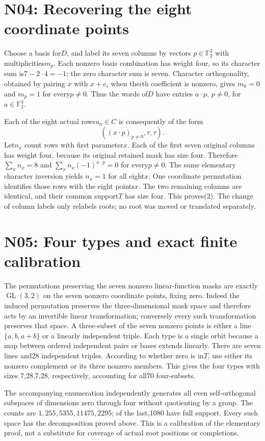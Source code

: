 \documentclass{article}
\begin{document}
\section{N04: Recovering the eight coordinate points}
Choose a basis for$D$, and label its seven columns by vectors
$p\in\mathbb F_2^3$ with multiplicities$m_p$. Each nonzero basis
combination has weight four, so its character sum is$7-2\cdot4=-1$;
the zero character sum is seven. Character orthogonality, obtained by
pairing $x$ with $x+e_i$ when the$i$th coefficient is nonzero, gives
$m_0=0$ and $m_p=1$ for every$p\ne0$. Thus the words of$D$ have
entries $a\cdot p$, $p\ne0$, for $a\in\mathbb F_2^3$.

Each of the eight actual rows$u_a\in C$ is consequently of the form
\[
              ((x\cdot p)_{p\ne0},\tau,\tau).
\]
Let$n_x$ count rows with first parameter$x$. Each of the first seven
original columns has weight four, because its original retained mask
has size four. Therefore $\sum_x n_x=8$ and
$\sum_x n_x(-1)^{x\cdot p}=0$ for every$p\ne0$. The same elementary
character inversion yields $n_x=1$ for all eight$x$. One coordinate
permutation identifies those rows with the eight points$x$.
The two remaining columns are identical, and their common support$T$
has size four. This proves(2). The change of column labels only
relabels roots; no root was moved or translated separately.

\section{N05: Four types and exact finite calibration}
The permutations preserving the seven nonzero linear-function masks
are exactly $\operatorname{GL}(3,2)$ on the seven nonzero coordinate
points, fixing zero. Indeed the induced permutation preserves the
three-dimensional mask space and therefore acts by an invertible
linear transformation; conversely every such transformation preserves
that space. A three-subset of the seven nonzero points is either a
line $\{a,b,a+b\}$ or a linearly independent triple. Each type is a
single orbit because a map between ordered independent pairs or bases
extends linearly. There are seven lines and28 independent triples.
According to whether zero is in$T$, use either its nonzero complement
or its three nonzero members. This gives the four types with sizes
7,28,7,28, respectively, accounting for all70 four-subsets.

The accompanying enumeration independently generates all even
self-orthogonal subspaces of dimensions zero through four without
quotienting by a group. The counts are $1,255,5355,11475,2295$; of
the last,1080 have full support. Every such space has the decomposition
proved above. This is a calibration of the elementary proof, not a
substitute for coverage of actual root positions or completions.
\end{document}
